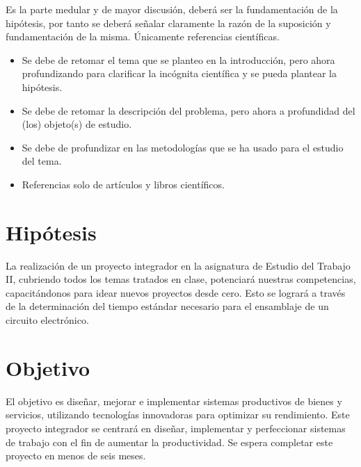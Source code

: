     Es la parte medular y de mayor discusión, deberá ser la fundamentación de la hipótesis, por tanto se deberá señalar claramente la razón de la suposición y fundamentación de la misma. Únicamente referencias científicas.
% 
% 
\begin{itemize}
    \item Se debe de retomar el tema que se planteo en la introducción, pero ahora profundizando para clarificar la incógnita científica y se pueda plantear la hipótesis.
    \item Se debe de retomar la descripción del problema, pero ahora a profundidad del (los) objeto(s) de estudio. 
    \item Se debe de profundizar en las metodologías que se ha usado para el estudio del tema.
    \item Referencias solo de artículos y libros científicos.
\end{itemize}
% 
% 
% 
% 

    
    
    \section{Hipótesis}
La realización de un proyecto integrador en la asignatura de Estudio del Trabajo II, cubriendo todos los temas tratados en clase, potenciará nuestras competencias, capacitándonos para idear nuevos proyectos desde cero. Esto se logrará a través de la determinación del tiempo estándar necesario para el ensamblaje de un circuito electrónico.
% 

    
    
    \section{Objetivo}
    
% 
El objetivo es diseñar, mejorar e implementar sistemas productivos de bienes y servicios, utilizando tecnologías innovadoras para optimizar su rendimiento. Este proyecto integrador se centrará en diseñar, implementar y perfeccionar sistemas de trabajo con el fin de aumentar la productividad. Se espera completar este proyecto en menos de seis meses.
% 

